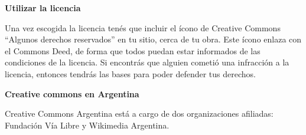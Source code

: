 {\bf Utilizar la licencia}

Una vez escogida la licencia tenés que incluir el ícono de Creative Commons “Algunos derechos reservados” en tu sitio, cerca de tu obra. Este ícono enlaza con el Commons Deed, de forma que todos puedan estar informados de las condiciones de la licencia. Si encontrás que alguien cometió una infracción a la licencia, entonces tendrás las bases para poder defender tus derechos.

{\bf Creative commons en Argentina}

Creative Commons Argentina está a cargo de dos organizaciones afiliadas: Fundación Vía Libre y Wikimedia Argentina.


